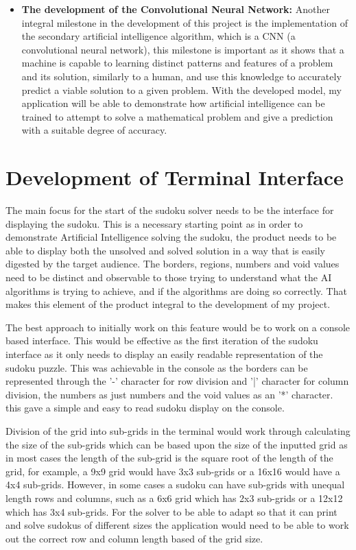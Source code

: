 \documentclass[]{final_report}
\begin{document}
\begin{itemize}
    \item \textbf{The development of the Convolutional Neural Network:}
    Another integral milestone in the development of this project is the implementation of the secondary artificial intelligence algorithm, which is a CNN (a convolutional neural network), this milestone is important as it shows that a machine is capable to learning distinct patterns and features of a problem and its solution, similarly to a human, and use this knowledge to accurately predict a viable solution to a given problem. With the developed model, my application will be able to demonstrate how artificial intelligence can be trained to attempt to solve a mathematical problem and give a prediction with a suitable degree of accuracy.
\end{itemize}

\section{Development of Terminal Interface}

The main focus for the start of the sudoku solver needs to be the interface for displaying the sudoku. This is a necessary starting point as in order to demonstrate Artificial Intelligence solving the sudoku, the product needs to be able to display both the unsolved and solved solution in a way that is easily digested by the target audience. The borders, regions, numbers and void values need to be distinct and observable to those trying to understand what the AI algorithms is trying to achieve, and if the algorithms are doing so correctly. That makes this element of the product integral to the development of my project. 

The best approach to initially work on this feature would be to work on a console based interface. This would be effective as the first iteration of the sudoku interface as it only needs to display an easily readable representation of the sudoku puzzle. This was achievable in the console as the borders can be represented through the '-' character for row division and '|' character for column division, the numbers as just numbers and the void values as an '*' character. this gave a simple and easy to read sudoku display on the console.

Division of the grid into sub-grids in the terminal would work through calculating the size of the sub-grids which can be based upon the size of the inputted grid as in most cases the length of the sub-grid is the square root of the length of the grid, for example, a 9x9 grid would have 3x3 sub-grids or a 16x16 would have a 4x4 sub-grids. However, in some cases a sudoku can have sub-grids with unequal length rows and columns, such as a 6x6 grid which has 2x3 sub-grids or a 12x12 which has 3x4 sub-grids. For the solver to be able to adapt so that it can print and solve sudokus of different sizes the application would need to be able to work out the correct row and column length based of the grid size. 
\end{document}
